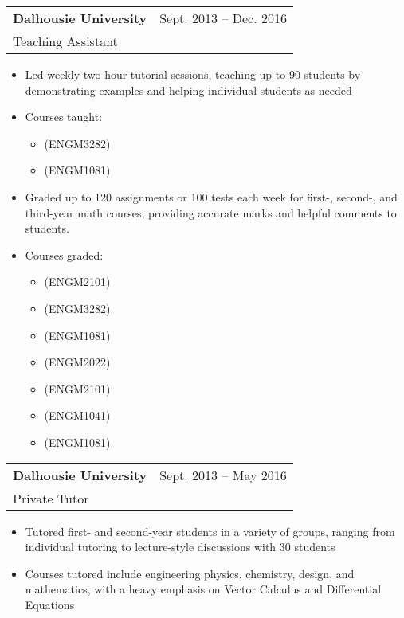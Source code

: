 \documentclass{article}
\begin{document}
\begin{center}
\begin{tabularx}{\textwidth}{Xr}
	\textbf{Dalhousie University}	&
	Sept. 2013 -- Dec. 2016 \\
	Teaching Assistant
\end{tabularx}
\end{center}
\begin{itemize}
	\item Led weekly two-hour tutorial sessions, teaching up to 90 students by demonstrating examples and helping individual students as needed 
	\item Courses taught:
	\begin{itemize}
	\item 
		 (ENGM3282)
	\item 
		 (ENGM1081)
	\end{itemize}
	\item Graded up to 120 assignments or 100 tests each week for first-, second-, and third-year math courses, providing accurate marks and helpful comments to students.
	\item Courses graded:
	\begin{itemize}
	\item 
		 (ENGM2101)
	\item 
		 (ENGM3282)
	\item 
		 (ENGM1081)
	\item 
		 (ENGM2022)
	\item 
		 (ENGM2101)
	\item 
		 (ENGM1041)
	\item 
		 (ENGM1081)
	\end{itemize}
\end{itemize}

\begin{tabularx}{\textwidth}{Xr}
	\textbf{Dalhousie University}	&
	Sept. 2013 -- May 2016 \\
	Private Tutor
\end{tabularx}
\begin{itemize}
	\item Tutored first- and second-year students in a variety of groups, ranging from individual tutoring to lecture-style discussions with 30 students
	\item Courses tutored include engineering physics, chemistry, design, and mathematics, with a heavy emphasis on Vector Calculus and Differential Equations
\end{itemize}
\end{document}
